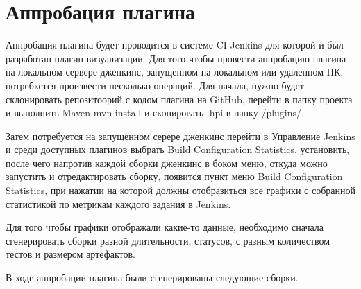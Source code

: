  \section{Аппробация плагина} \label{ch4:sec2}
 
 Аппробация плагина будет проводится в системе CI Jenkins для которой и был разработан плагин визуализации. Для того чтобы провести аппробацию плагина на локальном сервере дженкинс, запущенном на локальном или удаленном ПК, потребкется произвести несколько операций. Для начала, нужно будет склонировать репозитоорий с кодом плагина на GitHub, перейти в папку проекта и выполнить \cite{deployplugin} Maven mvn install и скопировать .hpi в папку /plugins/. 
 
 Затем потребуется на запущенном серере дженкинс перейти в Управление Jenkins  и среди доступных плагинов выбрать Build Configuration Statistics, установить, после чего напротив каждой сборки дженкинс в боком меню, откуда можно запустить и отредактировать сборку, появится пункт меню Build Configuration Statistics, при нажатии на которой должны отобразиться все графики с собранной статистикой по метрикам каждого задания в Jenkins. 
 
 Для того чтобы графики отображали какие-то данные, необходимо сначала сгенерировать сборки разной длительности, статусов, с разным количеством тестов и размером артефактов.
 
 В ходе аппробации плагина были сгенерированы следующие сборки.
 
